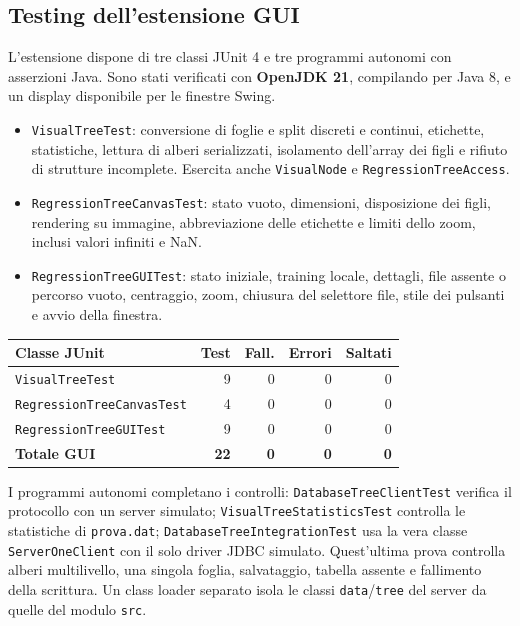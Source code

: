 \clearpage
\subsection*{Testing dell'estensione GUI}

L'estensione dispone di tre classi JUnit 4 e tre programmi autonomi con
asserzioni Java. Sono stati verificati con \textbf{OpenJDK 21}, compilando
per Java 8, e un display disponibile per le finestre Swing.

\begin{itemize}
  \item \texttt{VisualTreeTest}: conversione di foglie e split discreti e
        continui, etichette, statistiche, lettura di alberi serializzati,
        isolamento dell'array dei figli e rifiuto di strutture incomplete.
        Esercita anche \texttt{VisualNode} e \texttt{RegressionTreeAccess}.
  \item \texttt{RegressionTreeCanvasTest}: stato vuoto, dimensioni,
        disposizione dei figli, rendering su immagine, abbreviazione delle
        etichette e limiti dello zoom, inclusi valori infiniti e NaN.
  \item \texttt{RegressionTreeGUITest}: stato iniziale, training locale,
        dettagli, file assente o percorso vuoto, centraggio, zoom, chiusura
        del selettore file, stile dei pulsanti e avvio della finestra.
\end{itemize}

\begin{center}
\begin{tabular}{lrrrr}
\toprule
\textbf{Classe JUnit} & \textbf{Test} & \textbf{Fall.} & \textbf{Errori} & \textbf{Saltati} \\
\midrule
\texttt{VisualTreeTest} & 9 & 0 & 0 & 0 \\
\texttt{RegressionTreeCanvasTest} & 4 & 0 & 0 & 0 \\
\texttt{RegressionTreeGUITest} & 9 & 0 & 0 & 0 \\
\midrule
\textbf{Totale GUI} & \textbf{22} & \textbf{0} & \textbf{0} & \textbf{0} \\
\bottomrule
\end{tabular}
\end{center}

I programmi autonomi completano i controlli:
\texttt{DatabaseTreeClientTest} verifica il protocollo con un server simulato;
\texttt{VisualTreeStatisticsTest} controlla le statistiche di
\texttt{prova.dat}; \texttt{DatabaseTreeIntegrationTest} usa la vera classe
\texttt{ServerOneClient} con il solo driver JDBC simulato. Quest'ultima prova
controlla alberi multilivello, una singola foglia, salvataggio, tabella assente
e fallimento della scrittura. Un class loader separato isola le classi
\texttt{data}/\texttt{tree} del server da quelle del modulo \texttt{src}.

